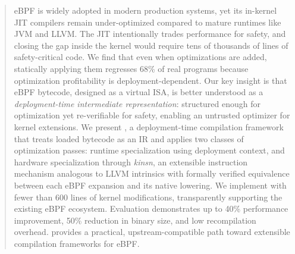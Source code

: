 \begin{abstract}

eBPF is widely adopted in modern production systems, yet its in-kernel JIT compilers remain under-optimized compared to mature runtimes like JVM and LLVM. The JIT intentionally trades performance for safety, and closing the gap inside the kernel would require tens of thousands of lines of safety-critical code. We find that even when optimizations are added, statically applying them regresses 68\% of real programs because optimization profitability is deployment-dependent. Our key insight is that eBPF bytecode, designed as a virtual ISA, is better understood as a \emph{deployment-time intermediate representation}: structured enough for optimization yet re-verifiable for safety, enabling an untrusted optimizer for kernel extensions. We present \tool, a deployment-time compilation framework that treats loaded bytecode as an IR and applies two classes of optimization passes: runtime specialization using deployment context, and hardware specialization through \emph{kinsn}, an extensible instruction mechanism analogous to LLVM intrinsics with formally verified equivalence between each eBPF expansion and its native lowering. We implement \tool with fewer than 600 lines of kernel modifications, transparently supporting the existing eBPF ecosystem. Evaluation demonstrates up to 40\% performance improvement, 50\% reduction in binary size, and low recompilation overhead. \tool provides a practical, upstream-compatible path toward extensible compilation frameworks for eBPF.

\end{abstract}



